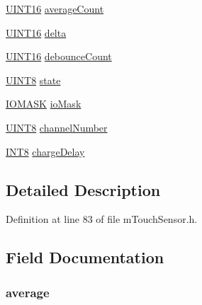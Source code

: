 \begin{DoxyCompactItemize}
\item 
\hyperlink{_generic_type_defs_8h_acfa284fa8026c4aace2728f7f15d6c13}{U\+I\+N\+T16} \hyperlink{structtag___s_e_n_s_o_r_af982393c43872bd9608e53a411ed5d77}{average\+Count}
\item 
\hyperlink{_generic_type_defs_8h_acfa284fa8026c4aace2728f7f15d6c13}{U\+I\+N\+T16} \hyperlink{structtag___s_e_n_s_o_r_abec2fb1fb9bb67c25a81c02cbcfae4df}{delta}
\item 
\hyperlink{_generic_type_defs_8h_acfa284fa8026c4aace2728f7f15d6c13}{U\+I\+N\+T16} \hyperlink{structtag___s_e_n_s_o_r_afd41567da9b02bcbd82d74221f7a4823}{debounce\+Count}
\item 
\hyperlink{_generic_type_defs_8h_ab27e9918b538ce9d8ca692479b375b6a}{U\+I\+N\+T8} \hyperlink{structtag___s_e_n_s_o_r_a6e9c4cbd32a1178b12f3a61f6855c896}{state}
\item 
\hyperlink{m_touch_sensor_8h_a8990929513b7ff7f33bdca651142c22f}{I\+O\+M\+A\+S\+K} \hyperlink{structtag___s_e_n_s_o_r_ae82fa8fb017b300164751fc9777ae1da}{io\+Mask}
\item 
\hyperlink{_generic_type_defs_8h_ab27e9918b538ce9d8ca692479b375b6a}{U\+I\+N\+T8} \hyperlink{structtag___s_e_n_s_o_r_aa5a5ad634a8b47b7533d8e0bbc0d39ed}{channel\+Number}
\item 
\hyperlink{_generic_type_defs_8h_a7ebe70ceca856797319175e30bcf003d}{I\+N\+T8} \hyperlink{structtag___s_e_n_s_o_r_a2aab41eb14b56632a983d442aa852b94}{charge\+Delay}
\end{DoxyCompactItemize}


\subsection{Detailed Description}


Definition at line 83 of file m\+Touch\+Sensor.\+h.



\subsection{Field Documentation}
\hypertarget{structtag___s_e_n_s_o_r_a4e620d91f1a62c365267c7f3d82c9d86}{}
\subsubsection[{average}]{ average}\label{structtag___s_e_n_s_o_r_a4e620d91f1a62c365267c7f3d82c9d86}


